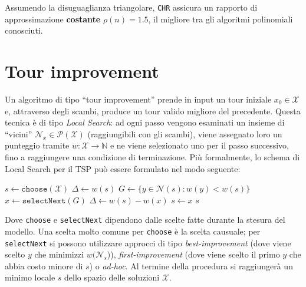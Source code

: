 Assumendo la disuguaglianza triangolare, \texttt{CHR} assicura un rapporto di approssimazione \textbf{costante}
$\rho(n) = 1.5$\cite{CHR}, il migliore tra gli algoritmi polinomiali conosciuti.
\ \\

\section{Tour improvement}

Un algoritmo di tipo ``tour improvement'' prende in input un tour iniziale $x_0 \in \mathcal{X}$ e, 
attraverso degli scambi, produce un tour valido migliore del precedente. Questa tecnica è di tipo 
\textit{Local Search}: ad ogni passo vengono esaminati un insieme di ``vicini'' $\mathcal{N}_{x} \in \mathscr{P}(\mathcal{X})$ 
(raggiungibili con gli scambi), viene assegnato loro un punteggio tramite $w : \mathcal{X} \rightarrow \mathbb{N}$ 
e ne viene selezionato uno per il passo successivo, fino a raggiungere una condizione di terminazione. 
Più formalmente, lo schema di Local Search per il TSP può essere formulato nel modo seguente:

\begin{algorithm}[H]
\caption{}
\begin{algorithmic}[1]
    \State $s \gets \texttt{choose}(\mathcal{X})$
    \State $\Delta \gets w(s)$
        \State $G \gets \big\{y \in \mathcal{N}(s) : w(y) < w(s)\big\}$
        \State $x \gets \texttt{selectNext}(G)$
        \State $\Delta \gets w(s)-w(x)$
        \State $s \gets x$
    \EndWhile
    \State \Return $s$
\EndFunction
\end{algorithmic}
\end{algorithm}

Dove \texttt{choose} e \texttt{selectNext} dipendono dalle scelte fatte durante la stesura del modello. 
Una scelta molto comune per \texttt{choose} è la scelta causuale; per \texttt{selectNext} si possono utilizzare 
approcci di tipo \textit{best-improvement} (dove viene scelto $y$ che minimizzi $w(\mathcal{N}_s$)), \textit{first-improvement} 
(dove viene scelto il primo $y$ che abbia costo minore di $s$) o \textit{ad-hoc}. Al termine 
della procedura si raggiungerà un minimo locale $s$ dello spazio delle soluzioni $\mathcal{X}$.


